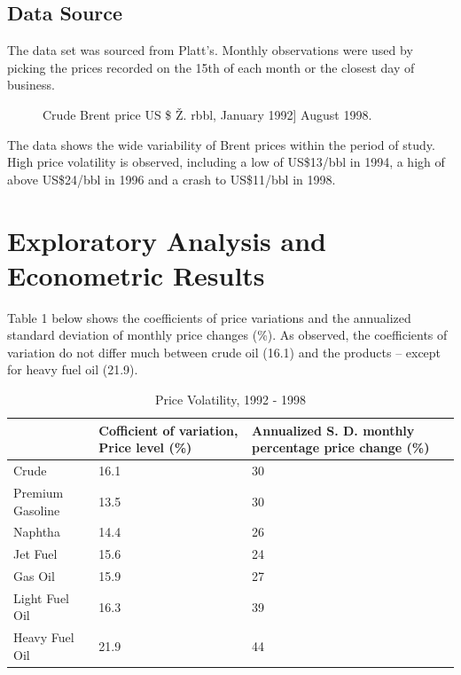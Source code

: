 \documentclass[a4paper,10pt]{article}
\begin{document}
\subsection*{Data Source}
The data set was sourced from Platt’s. Monthly observations were used by picking the prices recorded on the 15th of each month or the closest day of business.
\begin{figure}[h]
    \centering
	\noindent{}
	\caption[Oil Price]{Crude Brent price US \$ Ž. rbbl, January 1992] August 1998.}
    \label{fig:oilprice2}
\end{figure}

The data shows the wide variability of Brent prices within the period of study. High price volatility is observed, including a low of US\$13/bbl in 1994, a high of above US\$24/bbl in 1996 and a crash to US\$11/bbl in 1998.

\section*{Exploratory Analysis and Econometric Results}
Table 1 below shows the coefficients of price variations and the annualized standard deviation of monthly price changes (\%). As observed, the coefficients of variation do not differ much between crude oil (16.1) and the products – except for heavy fuel oil (21.9).

\begin{table}[h!]
\begin{tabular}{|p{3cm}|p{4cm}|p{4cm}|}
    \hline
    & Cofficient of variation, Price level (\%) & Annualized S. D. monthly percentage price change (\%)\\
    \hline
     Crude & 16.1 & 30 \\
     Premium Gasoline & 13.5 & 30 \\
     Naphtha & 14.4 & 26 \\
     Jet Fuel & 15.6 & 24 \\
     Gas Oil & 15.9 & 27 \\
     Light Fuel Oil & 16.3 & 39 \\
     Heavy Fuel Oil & 21.9 & 44 \\
     \hline
\end{tabular}
\caption{Price Volatility, 1992 - 1998}
\label{table:1}
\end{table}
\end{document}
